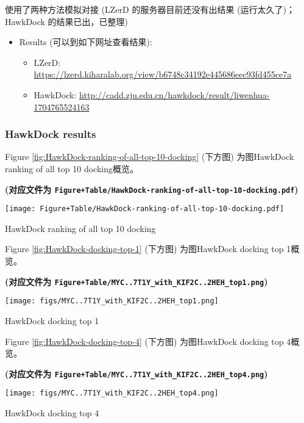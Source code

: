 \documentclass[
]{article}
\providecommand{\tightlist}{%
  \setlength{\itemsep}{0pt}\setlength{\parskip}{0pt}}
\begin{document}
使用了两种方法模拟对接 (LZerD 的服务器目前还没有出结果 (运行太久了)；HawkDock 的结果已出，已整理)

\begin{itemize}
\tightlist
\item
  Results (可以到如下网址查看结果):

  \begin{itemize}
  \tightlist
  \item
    LZerD: \url{https://lzerd.kiharalab.org/view/b6748c34192e445686eec93fd455ce7a}
  \item
    HawkDock: \url{http://cadd.zju.edu.cn/hawkdock/result/liwenhua-1704765524163}
  \end{itemize}
\end{itemize}

\hypertarget{hawkdock-results}{%
\subsubsection{HawkDock results}\label{hawkdock-results}}

Figure \ref{fig:HawkDock-ranking-of-all-top-10-docking} (下方图) 为图HawkDock ranking of all top 10 docking概览。

\textbf{(对应文件为 \texttt{Figure+Table/HawkDock-ranking-of-all-top-10-docking.pdf})}

\def\@captype{figure}
\begin{center}
\texttt{[image: Figure+Table/HawkDock-ranking-of-all-top-10-docking.pdf]}
\caption{HawkDock ranking of all top 10 docking}\label{fig:HawkDock-ranking-of-all-top-10-docking}
\end{center}

Figure \ref{fig:HawkDock-docking-top-1} (下方图) 为图HawkDock docking top 1概览。

\textbf{(对应文件为 \texttt{Figure+Table/MYC..7T1Y\_with\_KIF2C..2HEH\_top1.png})}

\def\@captype{figure}
\begin{center}
\texttt{[image: figs/MYC..7T1Y\_with\_KIF2C..2HEH\_top1.png]}
\caption{HawkDock docking top 1}\label{fig:HawkDock-docking-top-1}
\end{center}

Figure \ref{fig:HawkDock-docking-top-4} (下方图) 为图HawkDock docking top 4概览。

\textbf{(对应文件为 \texttt{Figure+Table/MYC..7T1Y\_with\_KIF2C..2HEH\_top4.png})}

\def\@captype{figure}
\begin{center}
\texttt{[image: figs/MYC..7T1Y\_with\_KIF2C..2HEH\_top4.png]}
\caption{HawkDock docking top 4}\label{fig:HawkDock-docking-top-4}
\end{center}
\end{document}
